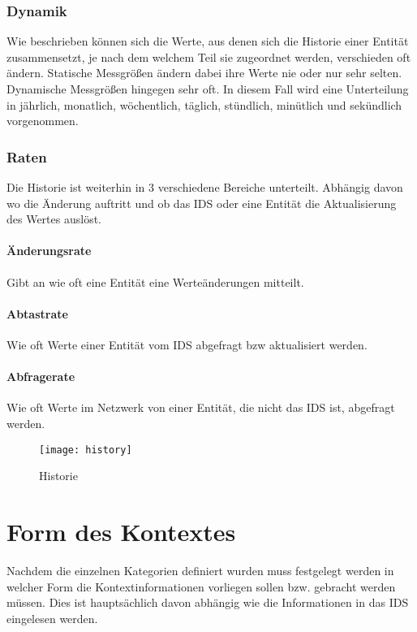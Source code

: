 \subsubsection{Dynamik}
Wie 
 beschrieben können sich die Werte, aus denen sich die Historie einer Entität zusammensetzt, je nach dem welchem Teil sie zugeordnet werden, verschieden oft ändern.
Statische Messgrößen ändern dabei ihre Werte nie oder nur sehr selten. Dynamische Messgrößen hingegen sehr oft. In diesem Fall wird eine Unterteilung in jährlich, monatlich, wöchentlich, täglich, stündlich, minütlich und sekündlich vorgenommen.
\subsubsection{Raten}
Die Historie ist weiterhin in 3 verschiedene Bereiche unterteilt. Abhängig davon wo die Änderung auftritt und ob das IDS oder eine Entität die Aktualisierung des Wertes auslöst.
\paragraph{Änderungsrate} 
Gibt an wie oft eine Entität eine Werteänderungen mitteilt.
\paragraph{Abtastrate}
Wie oft Werte einer Entität vom IDS abgefragt bzw aktualisiert werden.
\paragraph{Abfragerate}
Wie oft Werte im Netzwerk von einer Entität, die nicht das IDS ist, abgefragt werden.
\begin{figure}[H]
\centering
\texttt{[image: history]}
\caption{Historie}
\end{figure}


\section{Form des Kontextes}
Nachdem die einzelnen Kategorien definiert wurden muss festgelegt werden in welcher Form die Kontextinformationen vorliegen sollen bzw. gebracht werden müssen. Dies ist hauptsächlich davon abhängig wie die Informationen in das IDS eingelesen werden.




